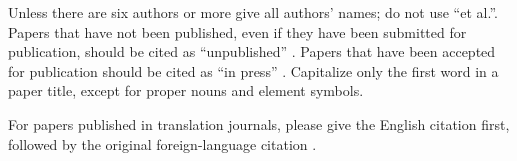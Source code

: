 \documentclass[conference]{IEEEtran}
\begin{document}
Unless there are six authors or more give all authors' names; do not use 
``et al.''. Papers that have not been published, even if they have been 
submitted for publication, should be cited as ``unpublished'' \cite{lu2017privacy}. Papers 
that have been accepted for publication should be cited as ``in press'' \cite{olteanu2018consensual}. 
Capitalize only the first word in a paper title, except for proper nouns and 
element symbols.\cite{sen2016ipic}

For papers published in translation journals, please give the English 
citation first, followed by the original foreign-language citation \cite{olteanu2018consensual}.


{\footnotesize
}
\end{document}
